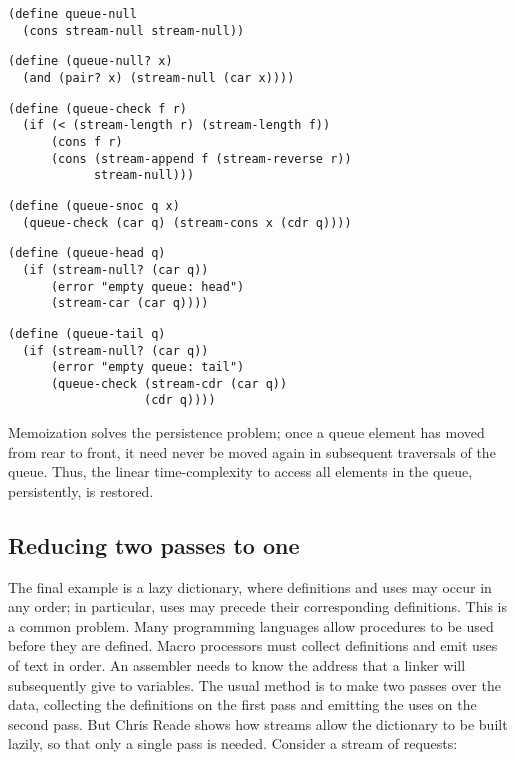 \begin{verbatim}
(define queue-null
  (cons stream-null stream-null))
\end{verbatim}

\begin{verbatim}
(define (queue-null? x)
  (and (pair? x) (stream-null (car x))))
\end{verbatim}

\begin{verbatim}
(define (queue-check f r)
  (if (< (stream-length r) (stream-length f))
      (cons f r)
      (cons (stream-append f (stream-reverse r))
            stream-null)))
\end{verbatim}

\begin{verbatim}
(define (queue-snoc q x)
  (queue-check (car q) (stream-cons x (cdr q))))
\end{verbatim}

\begin{verbatim}
(define (queue-head q)
  (if (stream-null? (car q))
      (error "empty queue: head")
      (stream-car (car q))))
\end{verbatim}

\begin{verbatim}
(define (queue-tail q)
  (if (stream-null? (car q))
      (error "empty queue: tail")
      (queue-check (stream-cdr (car q))
                   (cdr q))))
\end{verbatim}

Memoization solves the persistence problem; once a queue element has
moved from rear to front, it need never be moved again in subsequent
traversals of the queue. Thus, the linear time-complexity to access all
elements in the queue, persistently, is restored.

\subsection{Reducing two passes to
one}\label{reducing-two-passes-to-one}

The final example is a lazy dictionary, where definitions and uses may
occur in any order; in particular, uses may precede their corresponding
definitions. This is a common problem. Many programming languages allow
procedures to be used before they are defined. Macro processors must
collect definitions and emit uses of text in order. An assembler needs
to know the address that a linker will subsequently give to variables.
The usual method is to make two passes over the data, collecting the
definitions on the first pass and emitting the uses on the second pass.
But Chris Reade shows how streams allow the dictionary to be built
lazily, so that only a single pass is needed. Consider a stream of
requests:

